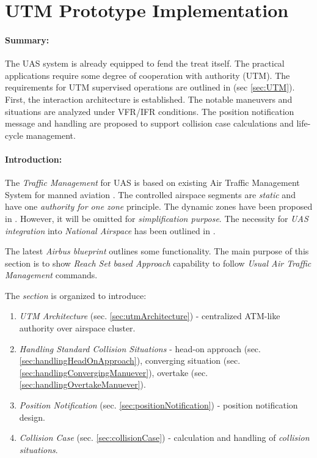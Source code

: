 \cleardoublepage
\section{UTM Prototype Implementation}\label{sec:UASTrafficManagement}

\paragraph{Summary:} The UAS system is already equipped to fend the treat itself. The practical applications require some degree of cooperation with authority (UTM). The requirements for UTM supervised operations are outlined in (sec \ref{sec:UTM}). First, the interaction architecture is established. The notable maneuvers and situations are analyzed under VFR/IFR conditions. The position notification message and handling are proposed to support collision case calculations and life-cycle management.

\paragraph{Introduction:} The \emph{Traffic Management} for UAS is based on existing Air Traffic Management System for manned aviation \cite{icao4444}. The controlled airspace segments are \emph{static} and have one \emph{authority for one zone} principle. The dynamic zones have been proposed in \cite{gerdes2016dynamic}. However, it will be omitted for \emph{simplification purpose}. The necessity for \emph{UAS integration} into \emph{National Airspace} has been outlined in \cite{spriesterbach2013unmanned}.

The latest \emph{Airbus blueprint} \cite{airbusUTM2018blueprint} outlines some functionality. The main purpose of this section is to show \emph{Reach Set based Approach} capability to follow \emph{Usual Air Traffic Management} commands.

The \emph{section} is organized to introduce:
\begin{enumerate}
    \item \emph{UTM Architecture} (sec. \ref{sec:utmArchitecture}) - centralized ATM-like authority over airspace cluster.
    
    \item \emph{Handling Standard Collision Situations} - head-on approach (sec. \ref{sec:handlingHeadOnApproach}), converging situation (sec. \ref{sec:handlingConvergingManuever}), overtake (sec. \ref{sec:handlingOvertakeManuever}).
    
    \item \emph{Position Notification} (sec. \ref{sec:positionNotification}) - position notification design.
    
    \item \emph{Collision Case} (sec. \ref{sec:collisionCase}) - calculation and handling of \emph{collision situations}.
    
\end{enumerate}

